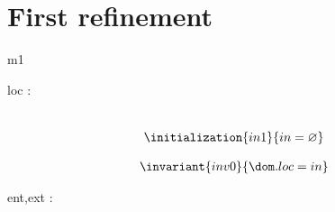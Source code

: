 \documentclass[12pt]{amsart}
\begin{document}
\section{First refinement}
\begin{machine}{m1}





\begin{use:set}{\Blk} \end{use:set}
\begin{use:fun}{\Train}{\Blk} \end{use:fun}


\begin{variable}
	loc : \Train \pfun \Blk
\end{variable}


%

%

\begin{align*}
\\ \initialization{in1}
	{ in = \emptyset }
\end{align*}


\begin{align*}
\invariant{inv0}
	{	\dom.loc = in }
\end{align*}

\begin{constant}
	ent,ext : \Blk
\end{constant}


\end{machine}
\end{document}
